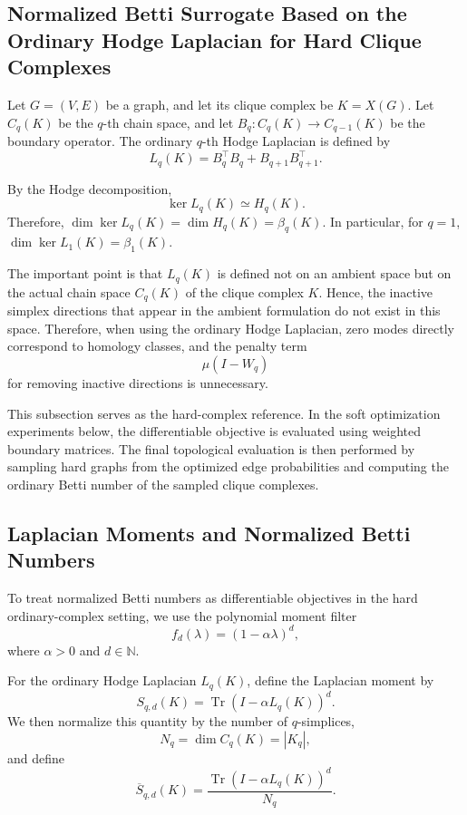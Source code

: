 \documentclass[pdflatex,sn-mathphys-ay]{sn-jnl}%
\theoremstyle{thmstyleone}%
\theoremstyle{thmstyletwo}%
\theoremstyle{thmstylethree}%
\begin{document}
\subsection{Normalized Betti Surrogate Based on the Ordinary Hodge Laplacian for Hard Clique Complexes}

Let $G=(V,E)$ be a graph, and let its clique complex be $K=X(G)$.
Let $C_q(K)$ be the \(q\)-th chain space, and let $B_q:C_q(K)\to C_{q-1}(K)$ be the boundary operator. The ordinary \(q\)-th Hodge Laplacian is defined by
\[
L_q(K)
=
B_q^\top B_q
+
B_{q+1}B_{q+1}^\top.
\]

By the Hodge decomposition,
\[
\ker L_q(K)
\simeq
H_q(K).
\]
Therefore, $\dim\ker L_q(K)
=
\dim H_q(K)
=
\beta_q(K)$.
In particular, for \(q=1\), $\dim\ker L_1(K)
=
\beta_1(K)$.

The important point is that \(L_q(K)\) is defined not on an ambient space but on the actual chain space \(C_q(K)\) of the clique complex \(K\). Hence, the inactive simplex directions that appear in the ambient formulation do not exist in this space. Therefore, when using the ordinary Hodge Laplacian, zero modes directly correspond to homology classes, and the penalty term
\[
\mu(I-W_q)
\]
for removing inactive directions is unnecessary.

This subsection serves as the hard-complex reference. In the soft optimization experiments below, the differentiable objective is evaluated using weighted boundary matrices. The final topological evaluation is then performed by sampling hard graphs from the optimized edge probabilities and computing the ordinary Betti number of the sampled clique complexes.

\subsection{Laplacian Moments and Normalized Betti Numbers}

To treat normalized Betti numbers as differentiable objectives in the hard ordinary-complex setting, we use the polynomial moment filter
\[
f_d(\lambda)
=
(1-\alpha\lambda)^d,
\]
where \(\alpha>0\) and \(d\in\mathbb{N}\).

For the ordinary Hodge Laplacian \(L_q(K)\), define the Laplacian moment by
\[
S_{q,d}(K)
=
\operatorname{Tr}
\left(
I-\alpha L_q(K)
\right)^d.
\]
We then normalize this quantity by the number of \(q\)-simplices,
\[
N_q
=
\dim C_q(K)
=
|K_q|,
\]
and define
\[
\overline{S}_{q,d}(K)
=
\frac{
\operatorname{Tr}
\left(
I-\alpha L_q(K)
\right)^d
}{
N_q
}.
\]
\end{document}
